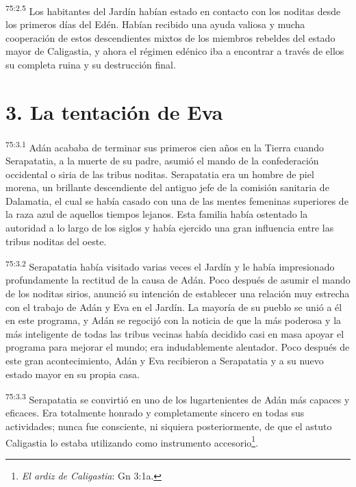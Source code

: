 \par
\textsuperscript{75:2.5} Los habitantes del Jardín habían estado en contacto con los noditas desde los primeros días del Edén. Habían recibido una ayuda valiosa y mucha cooperación de estos descendientes mixtos de los miembros rebeldes del estado mayor de Caligastia, y ahora el régimen edénico iba a encontrar a través de ellos su completa ruina y su destrucción final.

\section*{3. La tentación de Eva}
\par
\textsuperscript{75:3.1} Adán acababa de terminar sus primeros cien años en la Tierra cuando Serapatatia, a la muerte de su padre, asumió el mando de la confederación occidental o siria de las tribus noditas. Serapatatia era un hombre de piel morena, un brillante descendiente del antiguo jefe de la comisión sanitaria de Dalamatia, el cual se había casado con una de las mentes femeninas superiores de la raza azul de aquellos tiempos lejanos. Esta familia había ostentado la autoridad a lo largo de los siglos y había ejercido una gran influencia entre las tribus noditas del oeste.

\par
\textsuperscript{75:3.2} Serapatatia había visitado varias veces el Jardín y le había impresionado profundamente la rectitud de la causa de Adán. Poco después de asumir el mando de los noditas sirios, anunció su intención de establecer una relación muy estrecha con el trabajo de Adán y Eva en el Jardín. La mayoría de su pueblo se unió a él en este programa, y Adán se regocijó con la noticia de que la más poderosa y la más inteligente de todas las tribus vecinas había decidido casi en masa apoyar el programa para mejorar el mundo; era indudablemente alentador. Poco después de este gran acontecimiento, Adán y Eva recibieron a Serapatatia y a su nuevo estado mayor en su propia casa.

\par
\textsuperscript{75:3.3} Serapatatia se convirtió en uno de los lugartenientes de Adán más capaces y eficaces. Era totalmente honrado y completamente sincero en todas sus actividades; nunca fue consciente, ni siquiera posteriormente, de que el astuto Caligastia lo estaba utilizando como instrumento accesorio\footnote{\textit{El ardiz de Caligastia}: Gn 3:1a.}.

